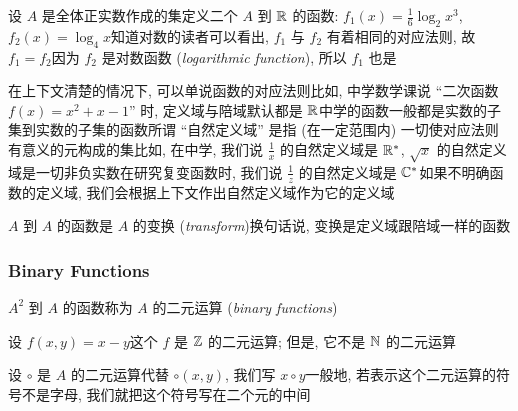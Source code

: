 \begin{example}
    设 $A$ 是全体正实数作成的集\period 定义二个 $A$ 到 $\mathbb{R}$ 的函数: $f_1 (x) = \frac16 \log_{2} {x^3}$, $f_2 (x) = \log_{4} {x}$\period 知道对数的读者可以看出, $f_1$ 与 $f_2$ 有着相同的对应法则, 故 $f_1 = f_2$\period 因为 $f_2$ 是对数函数 (\textit{logarithmic function}), 所以 $f_1$ 也是\period
\end{example}

\begin{remark}
    在上下文清楚的情况下, 可以单说函数的对应法则\period 比如, 中学数学课说 ``二次函数 $f(x) = x^2 + x - 1$'' 时, 定义域与陪域默认都是 $\mathbb{R}$\period 中学的函数一般都是实数的子集到实数的子集的函数\period 所谓 ``自然定义域'' 是指 (在一定范围内) 一切使对应法则有意义的元构成的集\period 比如, 在中学, 我们说 $\frac{1}{x}$ 的自然定义域是 $\mathbb{R}^{\ast}$, $\sqrt{x}$ 的自然定义域是一切非负实数\period 在研究复变函数时, 我们说 $\frac{1}{z}$ 的自然定义域是 $\mathbb{C}^{\ast}$\period 如果不明确函数的定义域, 我们会根据上下文作出自然定义域作为它的定义域\period
\end{remark}

\begin{definition}
    $A$ 到 $A$ 的函数是 $A$ 的变换 (\textit{transform})\period 换句话说, 变换是定义域跟陪域一样的函数\period
\end{definition}

\subsubsection*{Binary Functions}

\begin{definition}
    $A^2$ 到 $A$ 的函数称为 $A$ 的二元运算 (\textit{binary functions})\period
\end{definition}

\begin{example}
    设 $f(x,y) = x-y$\period 这个 $f$ 是 $\mathbb{Z}$ 的二元运算; 但是, 它不是 $\mathbb{N}$ 的二元运算\period
\end{example}

\begin{remark}
    设 $\circ$ 是 $A$ 的二元运算\period 代替 $\circ (x,y)$, 我们写 $x \circ y$\period 一般地, 若表示这个二元运算的符号不是字母, 我们就把这个符号写在二个元的中间\period
\end{remark}

